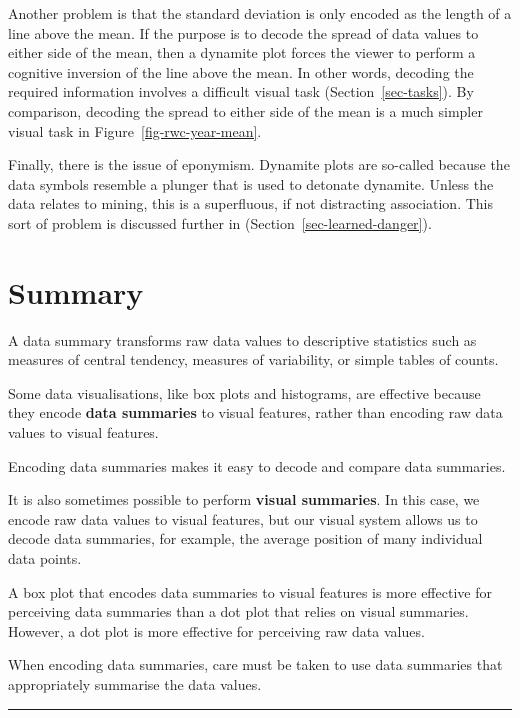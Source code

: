 \documentclass[
  letterpaper,
  DIV=11,
  numbers=noendperiod]{scrreprt}
\begin{document}
Another problem is that the standard deviation is only encoded as the
length of a line above the mean. If the purpose is to decode the spread
of data values to either side of the mean, then a dynamite plot forces
the viewer to perform a cognitive inversion of the line above the mean.
In other words, decoding the required information involves a difficult
visual task (Section~\ref{sec-tasks}). By comparison, decoding the
spread to either side of the mean is a much simpler visual task in
Figure~\ref{fig-rwc-year-mean}.

Finally, there is the issue of eponymism. Dynamite plots are so-called
because the data symbols resemble a plunger that is used to detonate
dynamite. Unless the data relates to mining, this is a superfluous, if
not distracting association. This sort of problem is discussed further
in (Section~\ref{sec-learned-danger}).

\section{Summary}\label{summary-7}

A data summary transforms raw data values to descriptive statistics such
as measures of central tendency, measures of variability, or simple
tables of counts.

Some data visualisations, like box plots and histograms, are effective
because they encode \textbf{data summaries} to visual features, rather
than encoding raw data values to visual features.

Encoding data summaries makes it easy to decode and compare data
summaries.

It is also sometimes possible to perform \textbf{visual summaries}. In
this case, we encode raw data values to visual features, but our visual
system allows us to decode data summaries, for example, the average
position of many individual data points.

A box plot that encodes data summaries to visual features is more
effective for perceiving data summaries than a dot plot that relies on
visual summaries. However, a dot plot is more effective for perceiving
raw data values.

When encoding data summaries, care must be taken to use data summaries
that appropriately summarise the data values.

\begin{center}\rule{0.5\linewidth}{0.5pt}\end{center}
\end{document}
